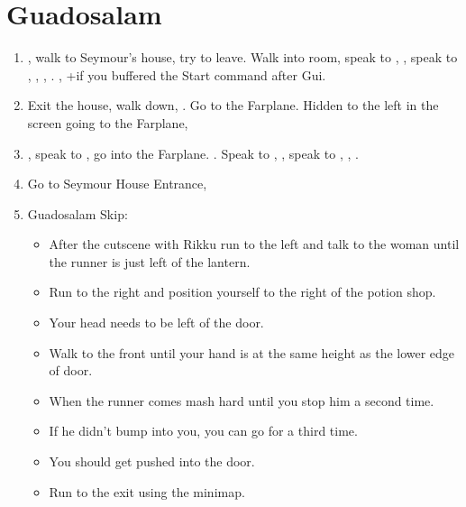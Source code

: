 \chapter{Guadosalam}\label{ch:guadosalam}

\begin{enumerate}
	\item \sd, walk to Seymour's house, try to leave. Walk into room, speak to \auron, \sd, speak to \wakka, \lulu, \rikku, \yuna. \sd, \skippablefmv+\cs[5:50] if you buffered the Start command after Gui.
	\item Exit the house, walk down, \sd. Go to the Farplane. Hidden to the left in the screen going to the Farplane, 
	\item \sd, speak to \auron, go into the Farplane. \cs[1:20]. Speak to \wakka, \sd, speak to \yuna, \cs[2:10], \sd.
	\item Go to Seymour House Entrance, \sd
	\bothcb \wincb \losscb
	\item Guadosalam Skip:
	      \begin{itemize}
		      \item After the cutscene with Rikku run to the left and talk to the woman until the runner is just left of the lantern.
			  \item Run to the right and position yourself to the right of the potion shop.
			  \item Your head needs to be left of the door.
			  \item Walk to the front until your hand is at the same height as the lower edge of door.
			  \item When the runner comes mash hard until you stop him a second time.
			  \item If he didn't bump into you, you can go for a third time.
			  \item You should get pushed into the door.
		      \item Run to the exit using the minimap.
	      \end{itemize}
\end{enumerate}